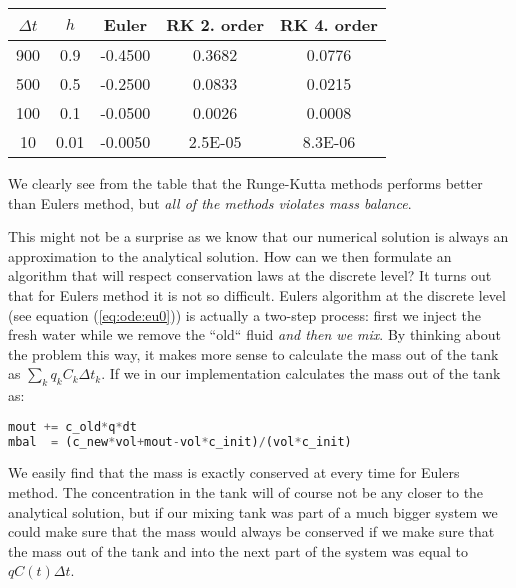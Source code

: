 \documentclass[graybox,sectrefs,envcountresetchap,open=right,final]{svmonodo}
\begin{document}
{\small   %

\vspace{4mm}

\begin{tabular}{ccccc}
\hline
\multicolumn{1}{c}{ ﻿$\Delta t$ } & \multicolumn{1}{c}{ $h$ } & \multicolumn{1}{c}{ Euler } & \multicolumn{1}{c}{ RK 2. order } & \multicolumn{1}{c}{ RK 4. order } \\
\hline
900         & 0.9  & -0.4500 & 0.3682      & 0.0776      \\
500         & 0.5  & -0.2500 & 0.0833      & 0.0215      \\
100         & 0.1  & -0.0500 & 0.0026      & 0.0008      \\
10          & 0.01 & -0.0050 & 2.5E-05     & 8.3E-06     \\
\hline
\end{tabular}

\vspace{4mm}

}


\noindent
We clearly see from the table that the Runge-Kutta methods performs better than Eulers method, but
\emph{all of the methods violates mass balance}. 

This might not be a surprise as we know that our numerical solution is always an approximation to the analytical solution. How can 
we then formulate an algorithm that will respect conservation laws at the discrete level? It turns out that for Eulers method it is not
so difficult. Eulers algorithm at the discrete level (see equation (\ref{eq:ode:eu0})) is actually a two-step process: first we inject the fresh water while we remove the ``old`` fluid \emph{and then we mix}. By thinking about the
problem this way, it makes more sense to calculate the mass out of the tank as $\sum_kq_kC_k\Delta t_k$. If we in our implementation calculates the mass out of the tank as:



\begin{lstlisting}[language=python,style=blue1]
mout += c_old*q*dt
mbal  = (c_new*vol+mout-vol*c_init)/(vol*c_init)

\end{lstlisting}

We easily find that the mass is exactly conserved at every time for Eulers method. The concentration in the tank will of course not be any closer to the 
analytical solution, but if our mixing tank was part of a much bigger system we could make sure that the mass would always be conserved if we make
sure that the mass out of the tank and into the next part of the system was equal to $qC(t)\Delta t$. 
\end{document}
